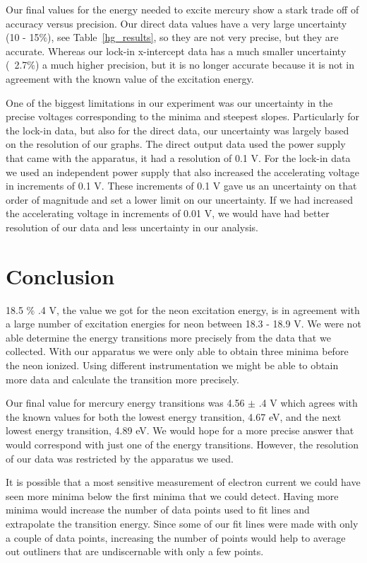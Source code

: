 \documentclass[prb,preprint]{revtex4-1}
\begin{document}
Our final values for the energy needed to excite mercury show a stark trade off of accuracy versus precision. Our direct data values have a very large uncertainty (10 - 15$\%$), see Table~\ref{hg_results}, so they are not very precise, but they are accurate. Whereas our lock-in x-intercept data has a much smaller uncertainty (~2.7$\%$) a much higher precision, but it is no longer accurate because it is not in agreement with the known value of the excitation energy.

One of the biggest limitations in our experiment was our uncertainty in the precise voltages corresponding to the minima and steepest slopes. Particularly for the lock-in data, but also for the direct data, our uncertainty was largely based on the resolution of our graphs. The direct output data used the power supply that came with the apparatus, it had a resolution of 0.1 V. For the lock-in data we used an independent power supply that also increased the accelerating voltage in increments of 0.1 V. These increments of 0.1 V gave us an uncertainty on that order of magnitude and set a lower limit on our uncertainty. If we had increased the accelerating voltage in increments of 0.01 V, we would have had better resolution of our data and less uncertainty in our analysis. 

\section{Conclusion}

18.5 $\%$ .4 V, the value we got for the neon excitation energy, is in agreement with a large number of excitation energies for neon between 18.3 - 18.9 V. We were not able determine the energy transitions more precisely from the data that we collected. With our apparatus we were only able to obtain three minima before the neon ionized. Using different instrumentation we might be able to obtain more data and calculate the transition more precisely.

Our final value for mercury energy transitions was 4.56 $\pm$ .4 V which agrees with the known values for both the lowest energy transition, 4.67 eV, and the next lowest energy transition, 4.89 eV. We would hope for a more precise answer that would correspond with just one of the energy transitions. However, the resolution of our data was restricted by the apparatus we used.

It is possible that a most sensitive measurement of electron current we could have seen more minima below the first minima that we could detect. Having more minima would increase the number of data points used to fit lines and extrapolate the transition energy. Since some of our fit lines were made with only a couple of data points, increasing the number of points would help to average out outliners that are undiscernable with only a few points. 
\end{document}
